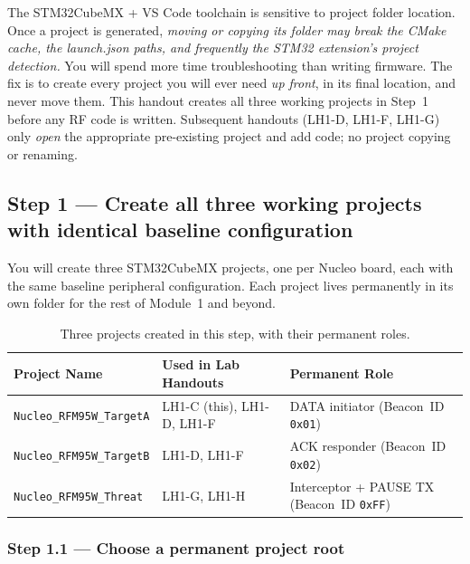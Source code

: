 \documentclass[11pt,letterpaper]{article}
\begin{document}
\begin{tcolorbox}[warning={Create All Projects Now --- Do Not Copy or Move Folders Later}]
	The STM32CubeMX + VS Code toolchain is sensitive to project folder location. Once a project is generated, \emph{moving or copying its folder may break the CMake cache, the launch.json paths, and frequently the STM32 extension's project detection.} You will spend more time troubleshooting than writing firmware. The fix is to create every project you will ever need \emph{up front}, in its final location, and never move them. This handout creates all three working projects in Step~1 before any RF code is written. Subsequent handouts (LH1-D, LH1-F, LH1-G) only \emph{open} the appropriate pre-existing project and add code; no project copying or renaming.
\end{tcolorbox}

\newpage
\subsection{Step 1 --- Create all three working projects with identical baseline configuration}

You will create three STM32CubeMX projects, one per Nucleo board, each with the same baseline peripheral configuration. Each project lives permanently in its own folder for the rest of Module~1 and beyond.

\begin{table}[h!]
	\centering
	\caption{Three projects created in this step, with their permanent roles.}
	\label{tab:projects}
	\renewcommand{\arraystretch}{1.3}
	\begin{tabular}{l l l}
		\toprule
		\textbf{Project Name} & \textbf{Used in Lab Handouts} & \textbf{Permanent Role} \\
		\midrule
		\texttt{Nucleo\_RFM95W\_TargetA} & LH1-C (this), LH1-D, LH1-F & DATA initiator (Beacon~ID \texttt{0x01}) \\
		\texttt{Nucleo\_RFM95W\_TargetB} & LH1-D, LH1-F                & ACK responder (Beacon~ID \texttt{0x02}) \\
		\texttt{Nucleo\_RFM95W\_Threat}  & LH1-G, LH1-H                & Interceptor + PAUSE TX (Beacon~ID \texttt{0xFF}) \\
		\bottomrule
	\end{tabular}
\end{table}

\subsubsection*{Step 1.1 --- Choose a permanent project root}
\end{document}
